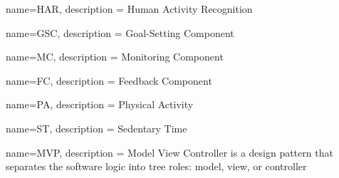 
{
  name=HAR,
  description = {Human Activity Recognition}
}

{
    name=GSC,
    description = {Goal-Setting Component}
}

{
    name=MC,
    description = {Monitoring Component}
}

{
    name=FC,
    description = {Feedback Component}
}

{
    name=PA,
    description = {Physical Activity}
}

{
    name=ST,
    description = {Sedentary Time}
}

{
    name=MVP,
    description = {Model View Controller is a design pattern that separates the software logic into tree roles: model, view, or controller}
}

\glsaddall %
\printglossaries